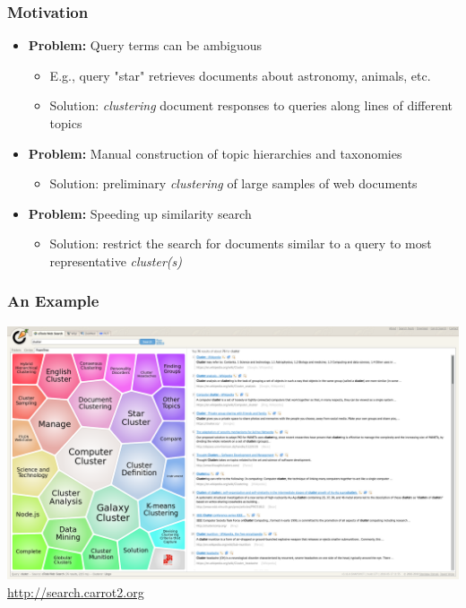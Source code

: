 \documentclass{beamer}
\begin{document}
\begin{frame}
  \frametitle{Motivation}

  \begin{itemize}
  \item<+-> \textbf{Problem:} Query terms can be ambiguous
    \begin{itemize}
    \item E.g., query "star" retrieves documents about astronomy, animals, etc.
    \item<+->  Solution: \emph{clustering} document responses to queries along lines
      of different topics
    \end{itemize}
  \item<+-> \textbf{Problem:} Manual construction of topic hierarchies and
    taxonomies
    \begin{itemize}
    \item<+-> Solution: preliminary \emph{clustering} of large samples of web documents
    \end{itemize}
  \item<+-> \textbf{Problem:} Speeding up similarity search
    \begin{itemize}
    \item<+-> Solution: restrict the search for documents similar to a query to
      most representative \emph{cluster(s)}
    \end{itemize}
  \end{itemize}

\end{frame}


\begin{frame}
  \frametitle{An Example}

  \centering
  \includegraphics[width=\linewidth]{carrot}\\
  \footnotesize\url{http://search.carrot2.org}

\end{frame}
\end{document}
